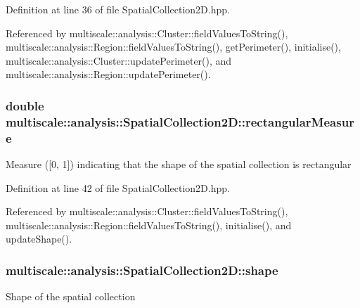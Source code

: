 Definition at line 36 of file Spatial\-Collection2\-D.\-hpp.



Referenced by multiscale\-::analysis\-::\-Cluster\-::field\-Values\-To\-String(), multiscale\-::analysis\-::\-Region\-::field\-Values\-To\-String(), get\-Perimeter(), initialise(), multiscale\-::analysis\-::\-Cluster\-::update\-Perimeter(), and multiscale\-::analysis\-::\-Region\-::update\-Perimeter().

\hypertarget{classmultiscale_1_1analysis_1_1SpatialCollection2D_aad7d79a7bd299d4d3c08a864cfcb77c3}{
\subsubsection[{rectangular\-Measure}]{\setlength{\rightskip}{0pt plus 5cm}double multiscale\-::analysis\-::\-Spatial\-Collection2\-D\-::rectangular\-Measure\hspace{0.3cm}{\ttfamily [protected]}}}\label{classmultiscale_1_1analysis_1_1SpatialCollection2D_aad7d79a7bd299d4d3c08a864cfcb77c3}
Measure (\mbox{[}0, 1\mbox{]}) indicating that the shape of the spatial collection is rectangular 

Definition at line 42 of file Spatial\-Collection2\-D.\-hpp.



Referenced by multiscale\-::analysis\-::\-Cluster\-::field\-Values\-To\-String(), multiscale\-::analysis\-::\-Region\-::field\-Values\-To\-String(), initialise(), and update\-Shape().

\hypertarget{classmultiscale_1_1analysis_1_1SpatialCollection2D_a4df95ecca90ce33332a69e0aefcf73d9}{
\subsubsection[{shape}]{ multiscale\-::analysis\-::\-Spatial\-Collection2\-D\-::shape\hspace{0.3cm}{\ttfamily [protected]}}}\label{classmultiscale_1_1analysis_1_1SpatialCollection2D_a4df95ecca90ce33332a69e0aefcf73d9}
Shape of the spatial collection 

